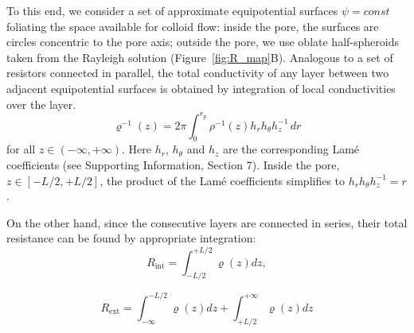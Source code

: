 \documentclass[12pt, a4paper]{article}
\begin{document}
To this end, we consider a set of approximate equipotential surfaces $\psi=const$ foliating the space available for colloid flow: inside the pore, the surfaces are circles concentric to the pore axis; outside the pore, we use oblate half-spheroids taken from the Rayleigh solution \cite{Strutt1878} (Figure~\ref{fig:R_map}B).
Analogous to a set of resistors connected in parallel, the total conductivity of any layer between two adjacent equipotential surfaces is obtained by integration of local conductivities over the layer. 
\begin{equation}
\varrho^{-1}(z)= 2\pi\int_{0}^{r_{\text{p}}^{}} \rho^{-1}(z)h_{r}h_{\theta}h^{-1}_{z} \, dr
\label{varrho}
\end{equation}
for all $z\in(-\infty, +\infty)$. Here $h_r$, $h_{\theta}$ and $h_z$ are the corresponding Lam\'e coefficients (see Supporting Information, Section 7). Inside the pore, $z\in[-L/2,+L/2]$, the product of the Lam\'e coefficients simplifies to $h_{r}h_{\theta}h^{-1}_{z}=r$.

On the other hand, since the consecutive layers are connected in series, their total resistance can be found by appropriate integration:
\begin{equation}
    R_{\text{int}} = \int_{-L/2}^{+L/2}\varrho(z) dz,
    \label{R_int}
\end{equation}

\begin{equation}
    R_{\text{ext}} = \int_{-\infty}^{-L/2}\varrho(z)dz +
\int_{+L/2}^{+\infty}\varrho(z)dz
    \label{R_ext}
\end{equation}


\end{document}
